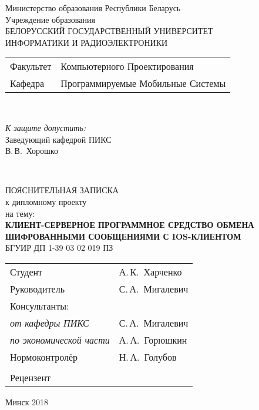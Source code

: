 \begin{titlepage}
  \begin{center}
    Министерство образования Республики Беларусь\\[1em]
    Учреждение образования\\
    БЕЛОРУССКИЙ ГОСУДАРСТВЕННЫЙ УНИВЕРСИТЕТ \\
    ИНФОРМАТИКИ И РАДИОЭЛЕКТРОНИКИ\\[1em]

    \begin{minipage}{\textwidth}
      \begin{flushleft}
        \begin{tabular}{ l l }
          Факультет & Компьютерного Проектирования\\
          Кафедра   & Программируемые Мобильные Системы
        \end{tabular}
      \end{flushleft}
    \end{minipage}\\[3em]

    \begin{flushright}
      \begin{minipage}{0.4\textwidth}
        \textit{К защите допустить:}\\[0.8em]
        Заведующий кафедрой ПИКС\\[0.45em]
        \underline{\hspace*{2.8cm}} В.\,В.~Хорошко
      \end{minipage}\\[2.2em]
    \end{flushright}

    {ПОЯСНИТЕЛЬНАЯ ЗАПИСКА}\\
    {к дипломному проекту}\\
    {на тему:}\\[1em]
    \textbf{\large\MakeUppercase{Клиент-серверное программное средство обмена шифрованными сообщениями с iOS-клиентом}}\\[1em]


    {БГУИР ДП 1-39 03 02 019 ПЗ}\\[2em]
    
    \begin{tabular}{ p{}p{} }
      Студент & А.\,К.~Харченко \\
      Руководитель & С.\,А.~Мигалевич \\
      Консультанты: &\\
      \hspace*{3ex}\emph{от кафедры ПИКС} & С.\,А.~Мигалевич \\
      \hspace*{3ex}\emph{по экономической части} & А.\,А.~Горюшкин \\
      Нормоконтролёр & Н.\,А.~Голубов\\
      & \\
      Рецензент &
    \end{tabular}
    
    \vfill
    {\normalsize Минск 2018}
  \end{center}
\end{titlepage}

\pagestyle{empty}
\newpage


\newpage
\pagestyle{fancy}